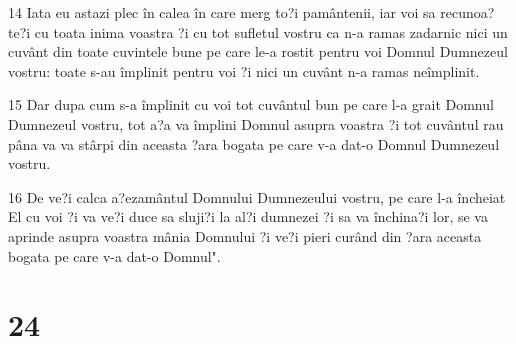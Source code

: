 \par 14 Iata eu astazi plec în calea în care merg to?i pamântenii, iar voi sa recunoa?te?i cu toata inima voastra ?i cu tot sufletul vostru ca n-a ramas zadarnic nici un cuvânt din toate cuvintele bune pe care le-a rostit pentru voi Domnul Dumnezeul vostru: toate s-au împlinit pentru voi ?i nici un cuvânt n-a ramas neîmplinit.
\par 15 Dar dupa cum s-a împlinit cu voi tot cuvântul bun pe care l-a grait Domnul Dumnezeul vostru, tot a?a va împlini Domnul asupra voastra ?i tot cuvântul rau pâna va va stârpi din aceasta ?ara bogata pe care v-a dat-o Domnul Dumnezeul vostru.
\par 16 De ve?i calca a?ezamântul Domnului Dumnezeului vostru, pe care l-a încheiat El cu voi ?i va ve?i duce sa sluji?i la al?i dumnezei ?i sa va închina?i lor, se va aprinde asupra voastra mânia Domnului ?i ve?i pieri curând din ?ara aceasta bogata pe care v-a dat-o Domnul".

\chapter{24}

